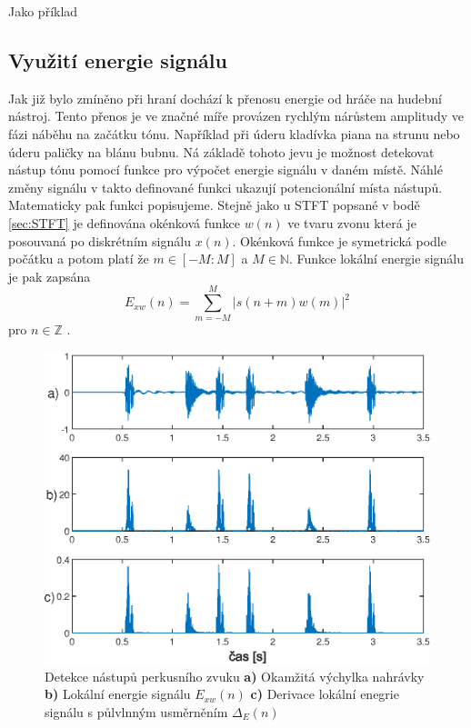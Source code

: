 Jako příklad 

  \subsection{Využití energie signálu} \label{sec:Energie_signalu}

  Jak již bylo zmíněno při hraní dochází k přenosu energie od hráče na hudební nástroj.
  Tento přenos je ve značné míře provázen rychlým nárůstem amplitudy ve fázi náběhu na začátku tónu.
  Například při úderu kladívka piana na strunu nebo úderu paličky na blánu bubnu.
  Ná základě tohoto jevu je možnost detekovat nástup tónu pomocí funkce pro výpočet energie signálu v daném místě.
  Náhlé změny signálu v takto definované funkci ukazují potencionální místa nástupů.
  Matematicky pak funkci popisujeme. 
  Stejně jako u \acs{STFT} popsané v bodě \ref{sec:STFT} je definována okénková funkce $w(n)$ ve tvaru zvonu  která je posouvaná po diskrétním signálu $x(n)$.
  Okénková funkce je symetrická podle počátku a potom platí že $ m \in [-M : M]$ a $M \in \mathbb{N}$. Funkce lokální energie signálu je pak zapsána
  \begin{equation}
    E_{xw}(n) = \sum_{m = -M}^{M} |s(n+m)w(m)|^2
  \end{equation}
  pro $n \in \mathbb{Z}$ \cite{fundamental_of_music_processing}.

  \begin{figure}[H]
    \centering
    \includegraphics[width = 0.8\linewidth]{obrazky/Energy_based_novely.eps}
    \caption{Detekce nástupů perkusního zvuku \textbf{a)} Okamžitá výchylka nahrávky \textbf{b)} Lokální energie signálu $E_{xw}(n)$ \textbf{c)} Derivace lokální enegrie signálu s půlvlnným usměrněním $\Delta_E(n)$}
    \label{fig:energy_based_novelty}
  \end{figure}

